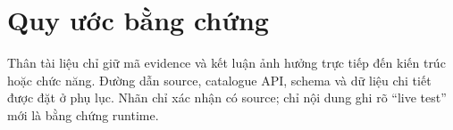 \section*{Quy ước bằng chứng}

Thân tài liệu chỉ giữ mã evidence và kết luận ảnh hưởng trực tiếp đến kiến trúc hoặc chức năng. Đường dẫn source, catalogue API, schema và dữ liệu chi tiết được đặt ở phụ lục. Nhãn \statusImplemented{} chỉ xác nhận có source; chỉ nội dung ghi rõ ``live test'' mới là bằng chứng runtime.

\clearpage
